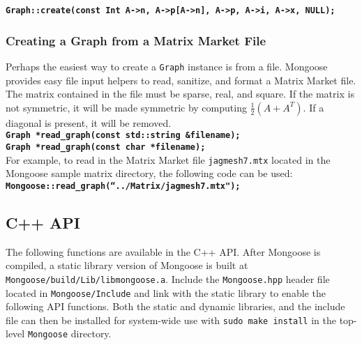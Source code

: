 \documentclass[letter]{article}
\begin{document}
\textbf{\texttt{Graph::create(const Int A->n, A->p[A->n], A->p, A->i, A->x, NULL);}}

\subsubsection{Creating a Graph from a Matrix Market File}

Perhaps the easiest way to create a \texttt{Graph} instance is from a file. Mongoose provides easy file input helpers to read, sanitize, and format a Matrix Market file. The matrix contained in the file must be sparse, real, and square. If the matrix is not symmetric, it will be made symmetric by computing $\frac{1}{2}(A+A^T)$. If a diagonal is present, it will be removed.\\

\textbf{\texttt{Graph *read\_graph(const std::string \&filename);}}\\
\textbf{\texttt{Graph *read\_graph(const char *filename);}}\\

For example, to read in the Matrix Market file \texttt{jagmesh7.mtx} located in the Mongoose sample matrix directory, the following code can be used:\\

\textbf{\texttt{Mongoose::read\_graph(``../Matrix/jagmesh7.mtx");}}

\subsection{C++ API}

The following functions are available in the C++ API. After Mongoose is compiled, a static library version of Mongoose is built at \texttt{Mongoose/build/Lib/libmongoose.a}. Include the \texttt{Mongoose.hpp} header file located in \texttt{Mongoose/Include} and link with the static library to enable the following API functions.
Both the static and dynamic libraries, and the include file can then be
installed for system-wide use with \texttt{sudo make install} in the top-level
\texttt{Mongoose} directory.
\end{document}

